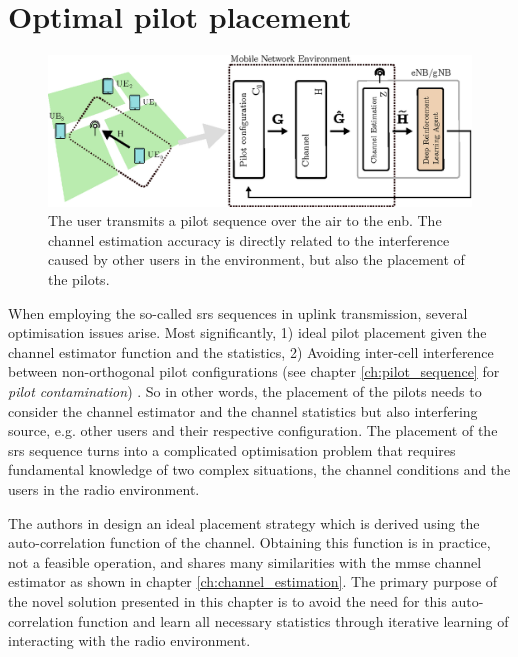 \section{Optimal pilot placement}\label{sec:optimal_pilot_placement}
\begin{figure}
    \includegraphics[width=\textwidth]{chapters/part_uplink/figures/RL_introduction_maindrawing.eps}
    \caption{The user transmits a pilot sequence over the air to the \gls{enb}. The channel estimation accuracy is directly related to the interference caused by other users in the environment, but also the placement of the pilots.}\label{fig:RL_introduction_maindrawing}
\end{figure}
When employing the so-called \gls{srs} sequences in uplink transmission, several optimisation issues arise. Most significantly, 1) ideal pilot placement given the channel estimator function and the statistics, 2) Avoiding inter-cell interference between non-orthogonal pilot configurations (see chapter \ref{ch:pilot_sequence} for \emph{pilot contamination}) . So in other words, the placement of the pilots needs to consider the channel estimator and the channel statistics but also interfering source, e.g. other users and their respective configuration. The placement of the \gls{srs} sequence turns into a complicated optimisation problem that requires fundamental knowledge of two complex situations, the channel conditions and the users in the radio environment. 

The authors in \cite{Simko2013AdaptiveSystems} design an ideal placement strategy which is derived using the auto-correlation function of the channel. Obtaining this function is in practice, not a feasible operation, and shares many similarities with the \gls{mmse} channel estimator as shown in chapter \ref{ch:channel_estimation}. The primary purpose of the novel solution presented in this chapter is to avoid the need for this auto-correlation function and learn all necessary statistics through iterative learning of interacting with the radio environment. 



